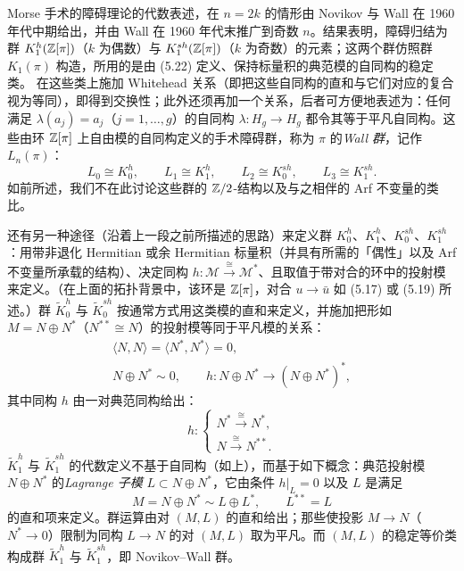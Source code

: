 Morse 手术的障碍理论的代数表述，在 $n=2k$ 的情形由 Novikov 与 Wall 在 1960 年代中期给出，并由 Wall 在 1960 年代末推广到奇数 $n$。结果表明，障碍归结为群 $K_{1}^{h}(\mathbb{Z}[\pi])$（$k$ 为偶数）与 $K_{1}^{sh}(\mathbb{Z}[\pi])$（$k$ 为奇数）的元素；这两个群仿照群 $K_{1}(\pi)$ 构造，所用的是由 (5.22) 定义、保持标量积的典范模的自同构的稳定类。
在这些类上施加 Whitehead 关系（即把这些自同构的直和与它们对应的复合视为等同），即得到交换性；此外还须再加一个关系，后者可方便地表述为：任何满足 $\lambda(a_{j})=a_{j}$（$j=1,\dots,g$）的自同构 $\lambda\colon H_{g}\to H_{g}$ 都令其等于平凡自同构。这些由环 $\mathbb{Z}[\pi]$ 上自由模的自同构定义的手术障碍群，称为 $\pi$ 的\emph{Wall 群}，记作 $L_{n}(\pi)$：
\begin{equation}
L_{0}\cong K_{0}^{h},\qquad L_{1}\cong K_{1}^{h},\qquad
L_{2}\cong K_{0}^{sh},\qquad L_{3}\cong K_{1}^{sh}. \tag{5.23}
\end{equation}
如前所述，我们不在此讨论这些群的 $\mathbb{Z}/2$-结构以及与之相伴的 Arf 不变量的类比。

还有另一种途径（沿着上一段之前所描述的思路）来定义群 $K_{0}^{h}$、$K_{1}^{h}$、$K_{0}^{sh}$、$K_{1}^{sh}$：用带非退化 Hermitian 或余 Hermitian 标量积（并具有所需的「偶性」以及 Arf 不变量所承载的结构）、决定同构 $h\colon\mathcal M\xrightarrow{\ \cong\ }\mathcal M^{*}$、且取值于带对合的环中的投射模来定义。（在上面的拓扑背景中，该环是 $\mathbb{Z}[\pi]$，对合 $u\to\bar u$ 如 (5.17) 或 (5.19) 所述。）群 $\tilde K_{0}^{h}$ 与 $\tilde K_{0}^{sh}$ 按通常方式用这类模的直和来定义，并施加把形如 $M=N\oplus N^{*}$（$N^{\ast\ast}\cong N$）的投射模等同于平凡模的关系：
\begin{equation}
\begin{gathered}
\langle N,N\rangle=\langle N^{*},N^{*}\rangle=0,\\
N\oplus N^{*}\sim 0,\qquad h\colon N\oplus N^{*}\to(N\oplus N^{*})^{*},
\end{gathered} \tag{5.24}
\end{equation}
其中同构 $h$ 由一对典范同构给出：
\begin{equation}
h\colon
\begin{cases}
N^{*}\xrightarrow{\ \cong\ }N^{*},\\
N\xrightarrow{\ \cong\ }N^{\ast\ast}.
\end{cases} \tag{5.25}
\end{equation}
$\tilde K_{1}^{h}$ 与 $\tilde K_{1}^{sh}$ 的代数定义不基于自同构（如上），而基于如下概念：典范投射模 $N\oplus N^{*}$ 的\emph{Lagrange 子模} $L\subset N\oplus N^{*}$，它由条件 $h|_{L}=0$ 以及 $L$ 是满足
\begin{equation}
M=N\oplus N^{*}\sim L\oplus L^{*},\qquad L^{\ast\ast}=L \tag{5.26}
\end{equation}
的直和项来定义。群运算由对 $(M,L)$ 的直和给出；那些使投影 $M\to N$（$N^{*}\to 0$）限制为同构 $L\to N$ 的对 $(M,L)$ 取为平凡。而 $(M,L)$ 的稳定等价类构成群 $\tilde K_{1}^{h}$ 与 $\tilde K_{1}^{sh}$，即 Novikov--Wall 群。

